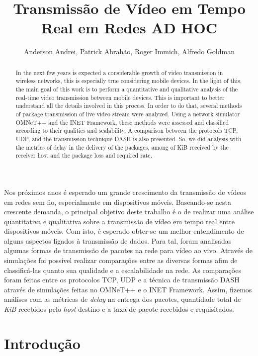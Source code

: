 \documentclass[12pt]{article}
\title{Transmissão de Vídeo em Tempo Real em Redes AD HOC}
\author{Anderson Andrei\inst{1}, Patrick Abrahão\inst{1}, Roger Immich\inst{2}, Alfredo Goldman\inst{1}}
\begin{document}
 

\maketitle

\begin{abstract}
In the next few years is expected a considerable growth of video transmission in wireless networks, this is especially true considering mobile devices. In the light of this, the main goal of this work is to perform a quantitative and qualitative analysis of the real-time video transmission between mobile devices. This is important to better understand all the details involved in this process.
In order to do that, several methods of package transmission of live video stream were analyzed. Using a network simulator OMNeT++ and the INET Framework, these methods were assessed and classified according to their qualities and scalability. A comparison between the protocols TCP, UDP, and the transmission technique DASH is also presented. So, we did analysis with the metrics of delay in the delivery of the packages, among of KiB received by the receiver host and the package loss and required rate.
\end{abstract}
     
\begin{resumo}
Nos próximos anos é esperado um grande crescimento da transmissão de vídeos em redes sem fio, especialmente em dispositivos móveis.
Baseando-se nesta crescente demanda, o principal objetivo deste trabalho é o de realizar uma análise quantitativa e qualitativa sobre a transmissão de vídeo em tempo real entre dispositivos móveis. Com isto, é esperado obter-se um melhor entendimento de alguns aspectos ligados à transmissão de dados. Para tal, foram analisadas algumas formas de transmissão de pacotes na rede para vídeo ao vivo. Através de simulações foi possível realizar comparações entre as diversas formas afim de classificá-las quanto sua qualidade e a escalabilidade na rede. As comparações foram feitas entre os protocolos TCP, UDP e a técnica de transmissão DASH através de simulações feitas no OMNeT++ e o INET Framework. Assim, fizemos análises com as métricas de \textit{delay} na entrega dos pacotes, quantidade total de \textit{KiB} recebidos pelo \textit{host} destino e a taxa de pacote recebidos e requisitados.
\end{resumo}

\section{Introdução} \label{sec:introducao}
	
\end{document}
